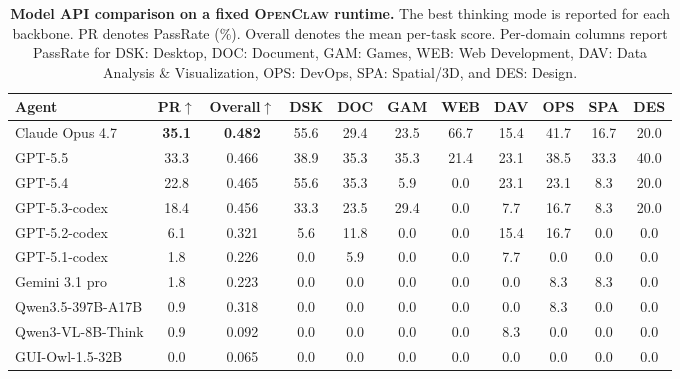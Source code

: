 \begin{table}[t]
\centering
\footnotesize
\setlength{\tabcolsep}{5pt}
\renewcommand{\arraystretch}{1.2}
\caption{\textbf{Model API comparison on a fixed \textsc{OpenClaw} runtime.}
The best thinking mode is reported for each backbone. PR denotes PassRate (\%). Overall denotes the mean per-task score. Per-domain columns report PassRate for DSK: Desktop, DOC: Document, GAM: Games, WEB: Web Development, DAV: Data Analysis \& Visualization, OPS: DevOps, SPA: Spatial/3D, and DES: Design.}
\label{tab:main}
\begin{tabular}{l cc | cccccccc}
\toprule
\textbf{Agent} & \textbf{PR}$\uparrow$ & \textbf{Overall}$\uparrow$ & \textbf{DSK} & \textbf{DOC} & \textbf{GAM} & \textbf{WEB} & \textbf{DAV} & \textbf{OPS} & \textbf{SPA} & \textbf{DES} \\
\midrule
Claude Opus 4.7      & \textbf{35.1} & \textbf{0.482} & 55.6 & 29.4 & 23.5 & 66.7 & 15.4 & 41.7 & 16.7 & 20.0 \\
GPT-5.5              & 33.3          & 0.466          & 38.9 & 35.3 & 35.3 & 21.4 & 23.1 & 38.5 & 33.3 & 40.0 \\
GPT-5.4              & 22.8          & 0.465          & 55.6 & 35.3 &  5.9 &  0.0 & 23.1 & 23.1 &  8.3 & 20.0 \\
GPT-5.3-codex        & 18.4          & 0.456          & 33.3 & 23.5 & 29.4 &  0.0 &  7.7 & 16.7 &  8.3 & 20.0 \\
GPT-5.2-codex        &  6.1          & 0.321          &  5.6 & 11.8 &  0.0 &  0.0 & 15.4 & 16.7 &  0.0 &  0.0 \\
GPT-5.1-codex        &  1.8          & 0.226          &  0.0 &  5.9 &  0.0 &  0.0 &  7.7 &  0.0 &  0.0 &  0.0 \\
Gemini 3.1 pro       &  1.8          & 0.223          &  0.0 &  0.0 &  0.0 &  0.0 &  0.0 &  8.3 &  8.3 &  0.0 \\
Qwen3.5-397B-A17B    &  0.9          & 0.318          &  0.0 &  0.0 &  0.0 &  0.0 &  0.0 &  8.3 &  0.0 &  0.0 \\
Qwen3-VL-8B-Think    &  0.9          & 0.092          &  0.0 &  0.0 &  0.0 &  0.0 &  8.3 &  0.0 &  0.0 &  0.0 \\
GUI-Owl-1.5-32B      &  0.0          & 0.065          &  0.0 &  0.0 &  0.0 &  0.0 &  0.0 &  0.0 &  0.0 &  0.0 \\
\bottomrule
\end{tabular}
\end{table}

